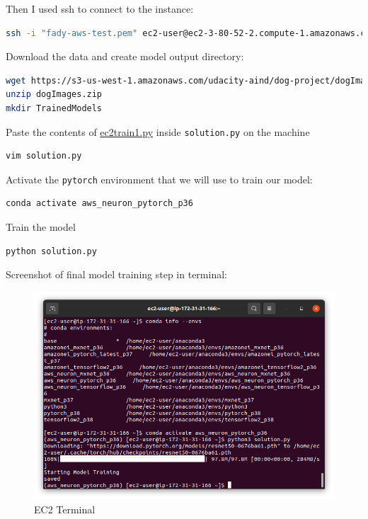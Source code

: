 \documentclass[a4paper
]{article}
\begin{document}
Then I used ssh to connect to the instance:

\begin{lstlisting}[language=bash]
ssh -i "fady-aws-test.pem" ec2-user@ec2-3-80-52-2.compute-1.amazonaws.com
\end{lstlisting}

Download the data and create model output directory:

\begin{lstlisting}[language=bash]
wget https://s3-us-west-1.amazonaws.com/udacity-aind/dog-project/dogImages.zip
unzip dogImages.zip
mkdir TrainedModels
\end{lstlisting}


Paste the contents of \href{https://github.com/FadyMorris/udacity-AWS-ml-engineer-nanodegree/tree/main/projects/04_operationalizing-an-aws-ml-project/ec2train1.py}{ec2train1.py} inside \texttt{solution.py} on
the machine

\begin{lstlisting}[language=bash]
vim solution.py
\end{lstlisting}

Activate the \texttt{pytorch} environment that we will use to train our
model:

\begin{lstlisting}[language=bash]
conda activate aws_neuron_pytorch_p36
\end{lstlisting}


Train the model

\begin{lstlisting}[language=bash]
python solution.py
\end{lstlisting}

Screenshot of final model training step in terminal:

\begin{figure}[H]
\centering
\includegraphics{../screenshots/02-b_ec2-terminal-ssh.png}
\caption{EC2 Terminal}
\end{figure}
\end{document}
